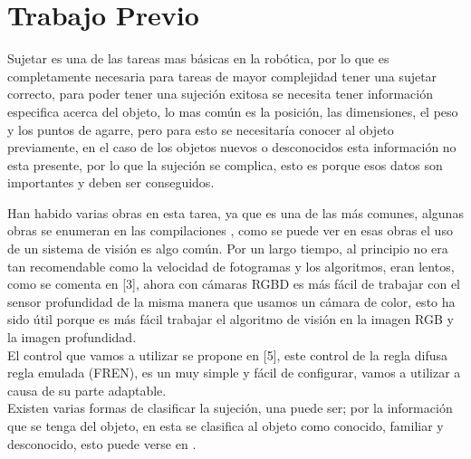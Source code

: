 


\section{Trabajo Previo}
Sujetar es una de las tareas mas básicas en la robótica, por lo que es completamente necesaria para tareas de mayor complejidad tener una sujetar correcto, para poder tener una sujeción exitosa se necesita tener información especifica acerca del objeto, lo mas común es la posición, las dimensiones, el peso y los puntos de agarre, pero para esto se necesitaría conocer al objeto previamente, en el caso de los objetos nuevos o desconocidos esta información no esta presente, por lo que la sujeción se complica, esto es porque esos datos son importantes y deben ser conseguidos.


Han habido varias obras en esta tarea, ya que es una de las más comunes, algunas obras se enumeran en las compilaciones \cite{carlos2013survey}, como se puede ver en esas obras el uso de un sistema de visión es algo común. Por un largo tiempo, al principio no era tan recomendable como la velocidad de fotogramas y los algoritmos, eran lentos, como se comenta en [3], ahora con cámaras RGBD es más fácil de trabajar con el sensor profundidad de la misma manera que usamos un cámara de color, esto ha sido útil porque es más fácil trabajar el algoritmo de visión en la imagen RGB y la imagen profundidad. \\
El control que vamos a utilizar se propone en [5], este control de la regla difusa regla emulada (FREN), es un muy simple y fácil de configurar, vamos a utilizar a causa de su parte adaptable. \\

Existen varias formas de clasificar la sujeción, una puede ser; por la información que se tenga del objeto, en esta se clasifica al objeto como conocido, familiar y desconocido, esto puede verse en \cite{bohg2014data,el20113d,carlos2013survey,zaharescuobject}.


